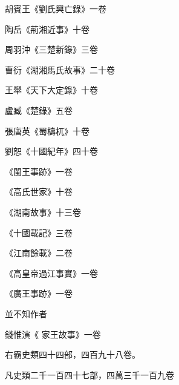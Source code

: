 \begin{pinyinscope}
 胡賓王《劉氏興亡錄》一卷



 陶岳《荊湘近事》十卷



 周羽沖《三楚新錄》三卷



 曹衍《湖湘馬氏故事》二十卷



 王舉《天下大定錄》十卷



 盧臧《楚錄》五卷



 張唐英《蜀檮杌》十卷



 劉恕《十國紀年》四十卷



 《閩王事跡》一卷



 《高氏世家》十卷



 《湖南故事》十三卷



 《十國載記》三卷



 《江南餘載》二卷



 《高皇帝過江事實》一卷



 《廣王事跡》一卷



 並不知作者



 錢惟演《
 家王故事》一卷



 右霸史類四十四部，四百九十八卷。



 凡史類二千一百四十七部，四萬三千一百九卷



\end{pinyinscope}